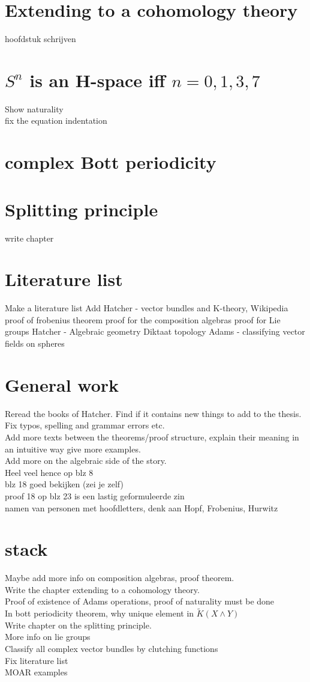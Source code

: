 \documentclass{report}
\begin{document}
\section{Extending to a cohomology theory}
hoofdstuk schrijven
\section{$S^n$ is an H-space iff $n = 0,1,3,7$}
Show naturality
\\fix the equation indentation
\section{complex Bott periodicity}
\section{Splitting principle}
write chapter
\section{Literature list}
Make a literature list
Add Hatcher - vector bundles and K-theory,
Wikipedia proof of frobenius theorem
proof for the composition algebras
proof for Lie groups
Hatcher - Algebraic geometry
Diktaat topology
Adams - classifying vector fields on spheres

\section{General work}
Reread the books of Hatcher. Find if it contains new things to add to the thesis.
\\Fix typos, spelling and grammar errors etc.
\\Add more texts between the theorems/proof structure, explain their meaning in an intuitive way give more examples.
\\Add more on the algebraic side of the story.
\\Heel veel hence op blz 8 
\\blz 18 goed bekijken (zei je zelf)
\\proof 18 op blz 23 is een lastig geformuleerde zin
\\namen van personen met hoofdletters, denk aan Hopf, Frobenius, Hurwitz

\section{stack}
Maybe add more info on composition algebras, proof theorem.
\\Write the chapter extending to a cohomology theory.
\\Proof of existence of Adams operations, proof of naturality must be done
\\In bott periodicity theorem, why unique element in $\tilde{K}(X \wedge Y)$
\\Write chapter on the splitting principle.
\\More info on lie groups
\\Classify all complex vector bundles by clutching functions
\\Fix literature list
\\MOAR examples
\end{document}
